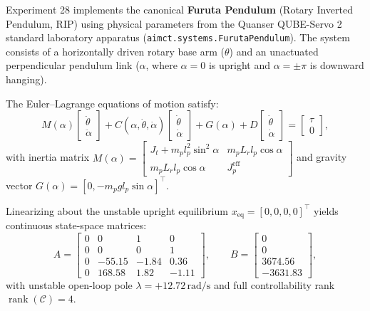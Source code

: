 \documentclass[11pt,a4paper]{article}
\begin{document}
Experiment 28 implements the canonical \textbf{Furuta Pendulum} (Rotary Inverted Pendulum, RIP) using physical parameters from the Quanser QUBE-Servo 2 standard laboratory apparatus (\texttt{aimct.systems.FurutaPendulum}). The system consists of a horizontally driven rotary base arm ($\theta$) and an unactuated perpendicular pendulum link ($\alpha$, where $\alpha = 0$ is upright and $\alpha = \pm\pi$ is downward hanging).

The Euler--Lagrange equations of motion satisfy:
\begin{equation}
M(\alpha)\begin{bmatrix} \ddot\theta \\ \ddot\alpha \end{bmatrix} + C(\alpha, \dot\theta, \dot\alpha)\begin{bmatrix} \dot\theta \\ \dot\alpha \end{bmatrix} + G(\alpha) + D\begin{bmatrix} \dot\theta \\ \dot\alpha \end{bmatrix} = \begin{bmatrix} \tau \\ 0 \end{bmatrix},
\end{equation}
with inertia matrix $M(\alpha) = \begin{bmatrix} J_t + m_p l_p^2 \sin^2\alpha & m_p L_r l_p \cos\alpha \\ m_p L_r l_p \cos\alpha & J_p^{\text{eff}} \end{bmatrix}$ and gravity vector $G(\alpha) = [0, -m_p g l_p \sin\alpha]^\top$.

Linearizing about the unstable upright equilibrium $x_{\text{eq}} = [0, 0, 0, 0]^\top$ yields continuous state-space matrices:
\begin{equation}
A = \begin{bmatrix} 0 & 0 & 1 & 0 \\ 0 & 0 & 0 & 1 \\ 0 & -55.15 & -1.84 & 0.36 \\ 0 & 168.58 & 1.82 & -1.11 \end{bmatrix}, \qquad B = \begin{bmatrix} 0 \\ 0 \\ 3674.56 \\ -3631.83 \end{bmatrix},
\end{equation}
with unstable open-loop pole $\lambda = +12.72\,\text{rad/s}$ and full controllability rank $\operatorname{rank}(\mathcal{C}) = 4$.
\end{document}
